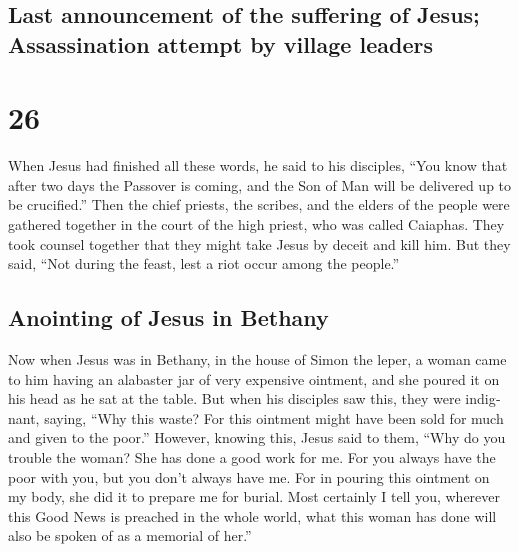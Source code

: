 \begin{paracol}{2}
\switchcolumn
\begin{otherlanguage}{english}

\hypertarget{last-announcement-of-the-suffering-of-jesus-assassination-attempt-by-village-leaders}{%
\subsection{Last announcement of the suffering of Jesus; Assassination
attempt by village
leaders}\label{last-announcement-of-the-suffering-of-jesus-assassination-attempt-by-village-leaders}}

\hypertarget{section-51}{%
\section{26}\label{section-51}}

 When Jesus had finished all these words, he said to his
disciples,  ``You know that after two days the Passover is
coming, and the Son of Man will be delivered up to be crucified.''
 Then the chief priests, the scribes, and the elders of
the people were gathered together in the court of the high priest, who
was called Caiaphas.  They took counsel together that they
might take Jesus by deceit and kill him.  But they said,
``Not during the feast, lest a riot occur among the people.''

\hypertarget{anointing-of-jesus-in-bethany}{%
\subsection{Anointing of Jesus in
Bethany}\label{anointing-of-jesus-in-bethany}}

 Now when Jesus was in Bethany, in the house of Simon the
leper,  a woman came to him having an alabaster jar of
very expensive ointment, and she poured it on his head as he sat at the
table.  But when his disciples saw this, they were
indignant, saying, ``Why this waste?  For this ointment
might have been sold for much and given to the poor.'' 
However, knowing this, Jesus said to them, ``Why do you trouble the
woman? She has done a good work for me.  For you always
have the poor with you, but you don't always have me. 
For in pouring this ointment on my body, she did it to prepare me for
burial.  Most certainly I tell you, wherever this Good
News is preached in the whole world, what this woman has done will also
be spoken of as a memorial of her.''


\end{otherlanguage}
\end{paracol}
